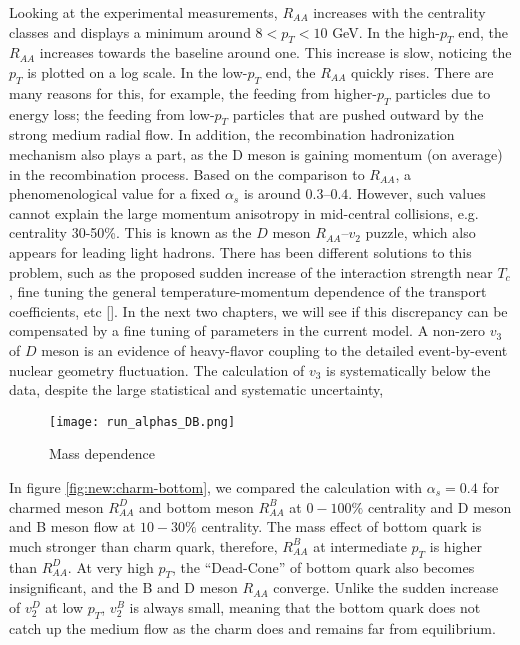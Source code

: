 Looking at the experimental measurements, $R_{AA}$ increases with the centrality classes and displays a minimum around $8 < p_T < 10$ GeV.
In the high-$p_T$ end, the $R_{AA}$ increases towards the baseline around one. 
This increase is slow, noticing the $p_T$ is plotted on a log scale.
In the low-$p_T$ end, the $R_{AA}$ quickly rises.
There are many reasons for this, for example, the feeding from higher-$p_T$ particles due to energy loss;  the feeding from low-$p_T$ particles that are pushed outward by the strong medium radial flow.
In addition, the recombination hadronization mechanism also plays a part, as the D meson is gaining momentum (on average) in the recombination process.
Based on the comparison to $R_{AA}$, a phenomenological value for a fixed $\alpha_s$ is around $0.3$--$0.4$.
However, such values cannot explain the large momentum anisotropy in mid-central collisions, e.g. centrality 30-50\%.
This is known as the $D$ meson $R_{AA}$--$v_2$ puzzle, which also appears for leading light hadrons.
There has been different solutions to this problem, such as the proposed sudden increase of the interaction strength near $T_c$, fine tuning the general temperature-momentum dependence of the transport coefficients, etc [].
In the next two chapters, we will see if this discrepancy can be compensated by a fine tuning of parameters in the current model.
A non-zero $v_3$ of $D$ meson is an evidence of heavy-flavor coupling to the detailed event-by-event nuclear geometry fluctuation.
The calculation of $v_3$ is systematically below the data, despite the large statistical and systematic uncertainty,

\begin{figure}
\centering
\texttt{[image: run\_alphas\_DB.png]}
\caption{Mass dependence}
\label{fig:new:fix-DB}
\end{figure}

In figure \ref{fig:new:charm-bottom}, we compared the calculation with $\alpha_s = 0.4$ for charmed meson $R_{AA}^D$ and bottom meson $R_{AA}^B$ at $0-100\%$ centrality and D meson and B meson flow at $10-30\%$ centrality.
The mass effect of bottom quark is much stronger than charm quark, therefore, $R_{AA}^B$ at intermediate $p_T$ is higher than $R_{AA}^D$. 
At very high $p_T$, the ``Dead-Cone'' of bottom quark also becomes insignificant, and the B and D meson $R_{AA}$ converge.
Unlike the sudden increase of $v_2^D$ at low $p_T$, $v_2^B$ is always small, meaning that the bottom quark does not catch up the medium flow as the charm does and remains far from equilibrium.

